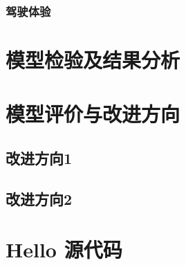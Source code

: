 \documentclass[withoutpreface,bwprint]{cumcmthesis}
\begin{document}
\subsubsection{驾驶体验}

\section{模型检验及结果分析}

\section{模型评价与改进方向}

\subsection{改进方向1}

\subsection{改进方向2}



\nocite{*}


\newpage
\appendix
\section{Hello 源代码}

\end{document}
